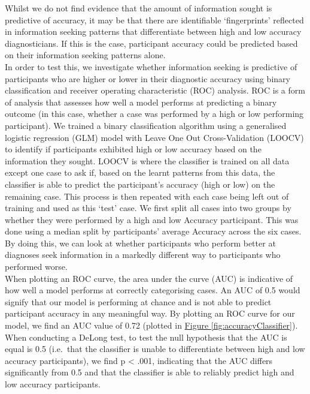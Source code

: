 \documentclass[a4paper, nobind]{templates/ociamthesis}
\begin{document}
Whilst we do not find evidence that the amount of information sought is predictive of accuracy, it may be that there are identifiable `fingerprints' reflected in information seeking patterns that differentiate between high and low accuracy diagnosticians. If this is the case, participant accuracy could be predicted based on their information seeking patterns alone.\\

In order to test this, we investigate whether information seeking is predictive of participants who are higher or lower in their diagnostic accuracy using binary classification and receiver operating characteristic (ROC) analysis. ROC is a form of analysis that assesses how well a model performs at predicting a binary outcome (in this case, whether a case was performed by a high or low performing participant). We trained a binary classification algorithm using a generalised logistic regression (GLM) model with Leave One Out Cross-Validation (LOOCV) to identify if participants exhibited high or low accuracy based on the information they sought. LOOCV is where the classifier is trained on all data except one case to ask if, based on the learnt patterns from this data, the classifier is able to predict the participant's accuracy (high or low) on the remaining case. This process is then repeated with each case being left out of training and used as this `test' case. We first split all cases into two groups by whether they were performed by a high and low Accuracy participant. This was done using a median split by participants' average Accuracy across the six cases. By doing this, we can look at whether participants who perform better at diagnoses seek information in a markedly different way to participants who performed worse.\\

When plotting an ROC curve, the area under the curve (AUC) is indicative of how well a model performs at correctly categorising cases. An AUC of 0.5 would signify that our model is performing at chance and is not able to predict participant accuracy in any meaningful way. By plotting an ROC curve for our model, we find an AUC value of 0.72 (plotted in \hyperref[fig:accuracyClassifier]{Figure \ref{fig:accuracyClassifier}}). When conducting a DeLong test, to test the null hypothesis that the AUC is equal is 0.5 (i.e.~that the classifier is unable to differentiate between high and low accuracy participants), we find p \textless{} .001, indicating that the AUC differs significantly from 0.5 and that the classifier is able to reliably predict high and low accuracy participants.\\
\end{document}
